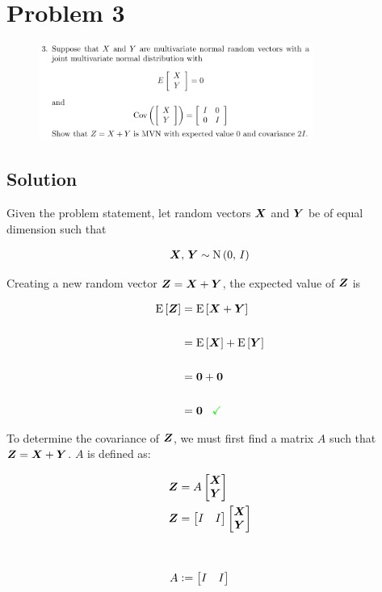 
\begingroup
\allowdisplaybreaks

\newpage
\section{Problem 3}

\begin{figure}[h]
	\centering
	\includegraphics[width=0.8\textwidth]{./images/prob3_statement.png}
\end{figure}

\subsection{Solution}

Given the problem statement, let random vectors $\boldsymbol{X}$ and $\boldsymbol{Y}$ be of equal dimension such that

\begin{align*}
	\boldsymbol{X},\,\boldsymbol{Y} \sim \textrm{N}\left(0,\,I\right)
\end{align*}

Creating a new random vector $\boldsymbol{Z} = \boldsymbol{X} + \boldsymbol{Y}$, the expected value of $\boldsymbol{Z}$ is

\begin{align*}
	\textrm{E}\left[\boldsymbol{Z}\right] &= \textrm{E}\left[\boldsymbol{X} + \boldsymbol{Y}\right] \\
	\\
	&= \textrm{E}\left[\boldsymbol{X}\right] + \textrm{E}\left[\boldsymbol{Y}\right] \\
	\\
	&= \boldsymbol{0} + \boldsymbol{0} \\
	\\
	&= \boldsymbol{0} \,\,\,\,\, \textcolor{green}{\checkmark}
\end{align*}

To determine the covariance of $\boldsymbol{Z}$, we must first find a matrix $A$ such that $\boldsymbol{Z} = \boldsymbol{X} + \boldsymbol{Y}$. $A$ is defined as:

\begin{align*}
	\boldsymbol{Z} &= A \begin{bmatrix} \boldsymbol{X} \\ \boldsymbol{Y} \end{bmatrix}
	\\
	\boldsymbol{Z} &= \begin{bmatrix} I & I \end{bmatrix} \begin{bmatrix} \boldsymbol{X} \\ \boldsymbol{Y} \end{bmatrix}
	\\
	\\
	\\
	A &\vcentcolon= \begin{bmatrix} I & I \end{bmatrix}
\end{align*}

